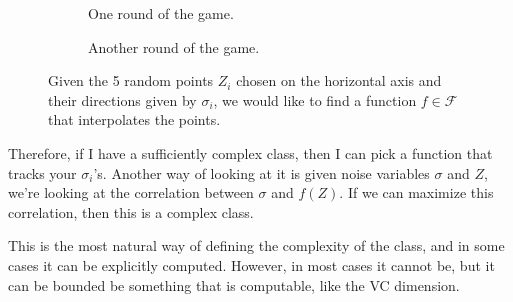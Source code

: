   \begin{figure}[H]
    \centering
    \begin{subfigure}[b]{0.48\textwidth}
      \centering
      \caption{One round of the game. }
    \end{subfigure}
    \hfill 
    \begin{subfigure}[b]{0.48\textwidth}
      \centering
      \caption{Another round of the game. }
    \end{subfigure}
    \caption{Given the 5 random points $Z_i$ chosen on the horizontal axis and their directions given by $\sigma_i$, we would like to find a function $f \in \mathcal{F}$ that interpolates the points.}
    \label{fig:game}
  \end{figure}

  Therefore, if I have a sufficiently complex class, then I can pick a function that tracks your $\sigma_i$'s. Another way of looking at it is given noise variables $\sigma$ and $Z$, we're looking at the correlation between $\sigma$ and $f(Z)$. If we can maximize this correlation, then this is a complex class. 

  This is the most natural way of defining the complexity of the class, and in some cases it can be explicitly computed. However, in most cases it cannot be, but it can be bounded be something that is computable, like the VC dimension. 

